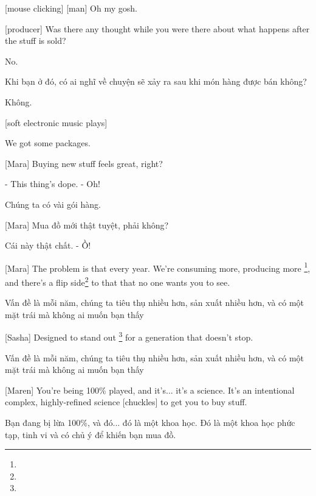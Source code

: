 \documentclass[a4paper]{article}
\begin{document}
	
	[mouse clicking] [man] Oh my gosh.
	
	[producer] Was there any thought while you were there about what happens after the stuff is sold?
	
	No.
	
	\begin{vietnamese-v2}
		Khi bạn ở đó, có ai nghĩ về chuyện sẽ xảy ra sau khi món hàng được bán không?
		
		Không.
	\end{vietnamese-v2}
	
	[soft electronic music plays]
	
	We got some packages.
	
	[Mara] Buying new stuff feels great, right?
	
	- This thing's dope. - Oh!
	
	\begin{vietnamese-v2}
		
		Chúng ta có vài gói hàng.
		
		[Mara] Mua đồ mới thật tuyệt, phải không?
		
		Cái này thật chất. - Ồ!
	\end{vietnamese-v2}
	
	[Mara] The problem is that every year. We're consuming more, producing more \footnote{}, and there's a flip side\footnote{} to that that no one wants you to see.
	
	\begin{vietnamese-v2}
		[Mara] Vấn đề là mỗi năm, chúng ta tiêu thụ nhiều hơn, sản xuất nhiều hơn, và có một mặt trái mà không ai muốn bạn thấy
	\end{vietnamese-v2}
	
	[Sasha] Designed to stand out \footnote[5]{} for a generation that doesn't stop.
	
	\begin{vietnamese-v2}
		[Mara] Vấn đề là mỗi năm, chúng ta tiêu thụ nhiều hơn, sản xuất nhiều hơn, và có một mặt trái mà không ai muốn bạn thấy
	\end{vietnamese-v2}

	
	[Maren] You're being 100\% played, and it's... it's a science. It's an intentional complex, highly-refined science [chuckles] to get you to buy stuff.
	
	\begin{vietnamese-v2}
		[Maren] Bạn đang bị lừa 100\%, và đó... đó là một khoa học. Đó là một khoa học phức tạp, tinh vi và có chủ ý để khiến bạn mua đồ.
	\end{vietnamese-v2}
	
\end{document}
